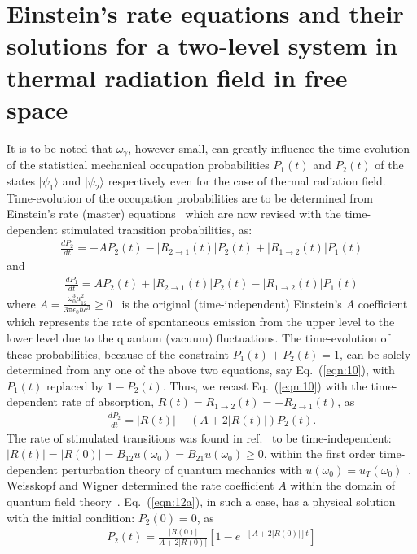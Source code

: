 \documentclass[aps,pra,twocolumn,showpacs,preprintnumbers,amsmath,amssymb,footinbib]{revtex4}
\begin{document}
\section{Einstein's rate equations and their solutions for a two-level system in thermal radiation field in free space}
It is to be noted that $\omega_\gamma$, however small, can greatly influence the time-evolution of the statistical mechanical occupation probabilities $P_1(t)$ and $P_2(t)$ of the states $|\psi_1\rangle$ and $|\psi_2\rangle$ respectively even for the case of thermal radiation field. Time-evolution of the occupation probabilities are to be determined from Einstein's rate (master) equations~\cite{Einstein,Griffiths,Feynman} which are now revised with the time-dependent stimulated transition probabilities, as:
\begin{eqnarray}\label{eqn:10}
\frac{d P_2}{dt}=-A P_2(t)-|R_{2\rightarrow1}(t)|P_2(t)+|R_{1\rightarrow2}(t)|P_1(t)
\end{eqnarray}
and
\begin{eqnarray}\label{eqn:11}
\frac{d P_1}{dt}=A P_2(t)+|R_{2\rightarrow1}(t)|P_2(t)-|R_{1\rightarrow2}(t)|P_1(t)
\end{eqnarray}
where $A=\frac{\omega_0^3\mu_{12}^2}{3\pi\epsilon_0\hbar c^3}\ge0$~\cite{Weisskopf,Griffiths} is the original (time-independent) Einstein's $A$ coefficient which represents the rate of spontaneous emission from the upper level to the lower level due to the quantum (vacuum) fluctuations. The time-evolution of these probabilities, because of the constraint $P_1(t)+P_2(t)=1$, can be solely determined from any one of the above two equations, say Eq.~(\ref{eqn:10}), with $P_1(t)$ replaced by $1-P_2(t)$. Thus, we recast Eq.~(\ref{eqn:10}) with the time-dependent rate of absorption, $R(t)=R_{1\rightarrow2}(t)=-R_{2\rightarrow1}(t)$, as
\begin{eqnarray}\label{eqn:12a}
\frac{d P_2}{dt}=|R(t)|-(A+2|R(t)|)P_2(t).
\end{eqnarray}
The rate of stimulated transitions was found in ref.~\cite{Dirac} to be time-independent: $|R(t)|=|R(0)|=B_{12}u(\omega_0)=B_{21}u(\omega_0)\ge0$, within the first order time-dependent perturbation theory of quantum mechanics with $u(\omega_0)=u_T(\omega_0)$~\cite{Griffiths}. Weisskopf and Wigner determined the rate coefficient $A$ within the domain of quantum field theory~\cite{Dirac,Weisskopf}. Eq.~(\ref{eqn:12a}), in such a case, has a physical solution with the initial condition: $P_2(0)=0$, as~\cite{Einstein,Griffiths}
\begin{eqnarray}\label{eqn:12b}
P_2(t)=\frac{|R(0)|}{A+2|R(0)|}[1-e^{-[A+2|R(0)|]t}]
\end{eqnarray}
\end{document}
